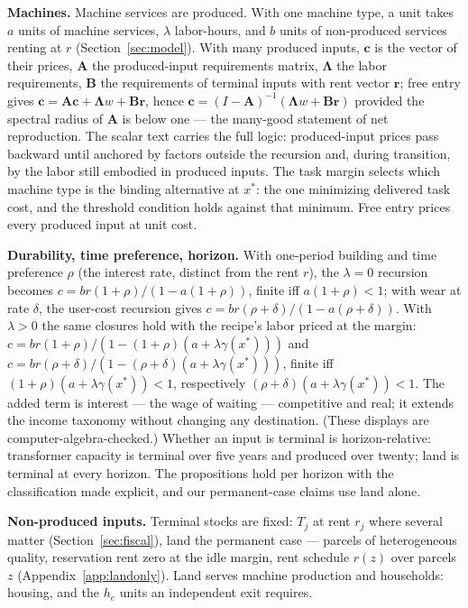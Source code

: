 \documentclass[12pt]{article}
\theoremstyle{plain}
\begin{document}
\textbf{Machines.} Machine services are produced. With one machine type, a unit takes $a$ units of machine services, $\lambda$ labor-hours, and $b$ units of non-produced services renting at $r$ (Section~\ref{sec:model}). With many produced inputs, $\mathbf{c}$ is the vector of their prices, $\mathbf{A}$ the produced-input requirements matrix, $\boldsymbol{\Lambda}$ the labor requirements, $\mathbf{B}$ the requirements of terminal inputs with rent vector $\mathbf{r}$; free entry gives $\mathbf{c} = \mathbf{A}\mathbf{c} + \boldsymbol{\Lambda}w + \mathbf{B}\mathbf{r}$, hence $\mathbf{c} = (I-\mathbf{A})^{-1}(\boldsymbol{\Lambda}w + \mathbf{B}\mathbf{r})$ provided the spectral radius of $\mathbf{A}$ is below one --- the many-good statement of net reproduction. The scalar text carries the full logic: produced-input prices pass backward until anchored by factors outside the recursion and, during transition, by the labor still embodied in produced inputs. The task margin selects which machine type is the binding alternative at $x^*$: the one minimizing delivered task cost, and the threshold condition holds against that minimum. Free entry prices every produced input at unit cost.

\textbf{Durability, time preference, horizon.} With one-period building and time preference $\rho$ (the interest rate, distinct from the rent $r$), the $\lambda = 0$ recursion becomes $c = br(1+\rho )/(1 - a(1+\rho ))$, finite iff $a(1+\rho ) < 1$; with wear at rate $\delta$, the user-cost recursion gives $c = br(\rho +\delta )/(1 - a(\rho +\delta ))$. With $\lambda > 0$ the same closures hold with the recipe's labor priced at the margin: $c = br(1+\rho )/(1 - (1+\rho )(a + \lambda \gamma (x^*)))$ and $c = br(\rho +\delta )/(1 - (\rho +\delta )(a + \lambda \gamma (x^*)))$, finite iff $(1+\rho )(a + \lambda \gamma (x^*)) < 1$, respectively $(\rho +\delta )(a + \lambda \gamma (x^*)) < 1$. The added term is interest --- the wage of waiting --- competitive and real; it extends the income taxonomy without changing any destination. (These displays are computer-algebra-checked.) Whether an input is terminal is horizon-relative: transformer capacity is terminal over five years and produced over twenty; land is terminal at every horizon. The propositions hold per horizon with the classification made explicit, and our permanent-case claims use land alone.

\textbf{Non-produced inputs.} Terminal stocks are fixed: $T_j$ at rent $r_j$ where several matter (Section~\ref{sec:fiscal}), land the permanent case --- parcels of heterogeneous quality, reservation rent zero at the idle margin, rent schedule $r(z)$ over parcels $z$ (Appendix~\ref{app:landonly}). Land serves machine production and households: housing, and the $h_e$ units an independent exit requires.
\end{document}
